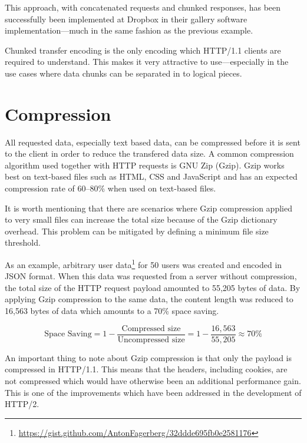 \documentclass{cslthse-msc}
\begin{document}
This approach, with concatenated requests and chunked responses, has been successfully been implemented at Dropbox in their gallery software implementation\cite{dropbox_chunked}---much in the same fashion as the previous example.

Chunked transfer encoding is the only encoding which HTTP/1.1 clients are required to understand\cite{chunked_required}. This makes it very attractive to use---especially in the use cases where data chunks can be separated in to logical pieces.

\section{Compression}
\label{compression}

All requested data, especially text based data, can be compressed before it is sent to the client in order to reduce the transfered data size. A common compression algorithm used together with HTTP requests is GNU Zip (Gzip). Gzip works best on text-based files such as HTML, CSS and JavaScript and has an expected compression rate of 60--80\% when used on text-based files\cite[page 237]{HPBN}.

It is worth mentioning that there are scenarios where Gzip compression applied to very small files can increase the total size because of the Gzip dictionary overhead. This problem can be mitigated by defining a minimum file size threshold\cite{google_gzip}.

As an example, arbitrary user data\footnote{\url{https://gist.github.com/AntonFagerberg/32ddde695fb0e2581176}} for 50 users was created and encoded in JSON format. When this data was requested from a server without compression, the total size of the HTTP request payload amounted to 55,205 bytes of data. By applying Gzip compression to the same data, the content length was reduced to 16,563 bytes of data which amounts to a 70\% space saving. 

\begin{equation}
\mbox{Space Saving} = 1 - \frac{\mbox{Compressed size}}{\mbox{Uncompressed size}} = 1 - \frac{16,563}{55,205} \approx 70\%
\end{equation}

An important thing to note about Gzip compression is that only the payload is compressed in HTTP/1.1\cite{header_compression}. This means that the headers, including cookies, are not compressed which would have otherwise been an additional performance gain. This is one of the improvements which have been addressed in the development of HTTP/2\cite[page 19]{hpbn2}.
\end{document}
